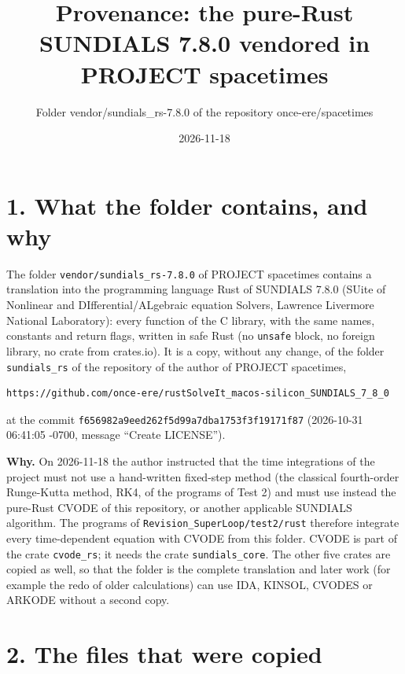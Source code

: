 \documentclass[
  10pt,
]{article}
\title{Provenance: the pure-Rust SUNDIALS 7.8.0 vendored in PROJECT
spacetimes}
\subtitle{Folder vendor/sundials\_rs-7.8.0 of the repository
once-ere/spacetimes}
\author{}
\date{2026-11-18}
\begin{document}
\maketitle

\hypertarget{what-the-folder-contains-and-why}{%
\section{1. What the folder contains, and
why}\label{what-the-folder-contains-and-why}}

The folder \texttt{vendor/sundials\_rs-7.8.0} of PROJECT spacetimes
contains a translation into the programming language Rust of SUNDIALS
7.8.0 (SUite of Nonlinear and DIfferential/ALgebraic equation Solvers,
Lawrence Livermore National Laboratory): every function of the C
library, with the same names, constants and return flags, written in
safe Rust (no \texttt{unsafe} block, no foreign library, no crate from
crates.io). It is a copy, without any change, of the folder
\texttt{sundials\_rs} of the repository of the author of PROJECT
spacetimes,

\begin{verbatim}
https://github.com/once-ere/rustSolveIt_macos-silicon_SUNDIALS_7_8_0
\end{verbatim}

at the commit \texttt{f656982a9eed262f5d99a7dba1753f3f19171f87}
(2026-10-31 06:41:05 -0700, message ``Create LICENSE'').

\textbf{Why.} On 2026-11-18 the author instructed that the time
integrations of the project must not use a hand-written fixed-step
method (the classical fourth-order Runge-Kutta method, RK4, of the
programs of Test 2) and must use instead the pure-Rust CVODE of this
repository, or another applicable SUNDIALS algorithm. The programs of
\texttt{Revision\_SuperLoop/test2/rust} therefore integrate every
time-dependent equation with CVODE from this folder. CVODE is part of
the crate \texttt{cvode\_rs}; it needs the crate
\texttt{sundials\_core}. The other five crates are copied as well, so
that the folder is the complete translation and later work (for example
the redo of older calculations) can use IDA, KINSOL, CVODES or ARKODE
without a second copy.

\hypertarget{the-files-that-were-copied}{%
\section{2. The files that were
copied}\label{the-files-that-were-copied}}
\end{document}

